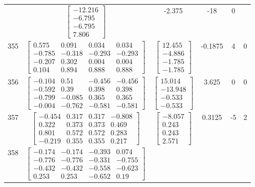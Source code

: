 \documentclass[a4paper,12pt]{article}
\begin{document}
\begin{tabular}{c c c c c c}
&
$\begin{bmatrix} -12.216 \\ -6.795 \\ -6.795 \\ 7.806 \end{bmatrix}$
&
-2.375
&
-18
&
0
\\
355
&
$\begin{bmatrix} 0.575 & 0.091 & 0.034 & 0.034 \\ -0.785 & -0.318 & -0.293 & -0.293 \\ -0.207 & 0.302 & 0.004 & 0.004 \\ 0.104 & 0.894 & 0.888 & 0.888 \end{bmatrix}$
&
$\begin{bmatrix} 12.455 \\ -4.886 \\ -1.785 \\ -1.785 \end{bmatrix}$
&
-0.1875
&
4
&
0
\\
356
&
$\begin{bmatrix} -0.104 & 0.51 & -0.456 & -0.456 \\ -0.592 & 0.39 & 0.398 & 0.398 \\ -0.799 & -0.085 & 0.365 & 0.365 \\ -0.004 & -0.762 & -0.581 & -0.581 \end{bmatrix}$
&
$\begin{bmatrix} 15.014 \\ -13.948 \\ -0.533 \\ -0.533 \end{bmatrix}$
&
3.625
&
0
&
0
\\
357
&
$\begin{bmatrix} -0.454 & 0.317 & 0.317 & -0.808 \\ 0.322 & 0.373 & 0.373 & 0.469 \\ 0.801 & 0.572 & 0.572 & 0.283 \\ -0.219 & 0.355 & 0.355 & 0.217 \end{bmatrix}$
&
$\begin{bmatrix} -8.057 \\ 0.243 \\ 0.243 \\ 2.571 \end{bmatrix}$
&
0.3125
&
-5
&
2
\\
358
&
$\begin{bmatrix} -0.174 & -0.174 & -0.393 & 0.074 \\ -0.776 & -0.776 & -0.331 & -0.755 \\ -0.432 & -0.432 & -0.558 & -0.623 \\ 0.253 & 0.253 & -0.652 & 0.19 \end{bmatrix}$

\end{tabular}
\end{document}
